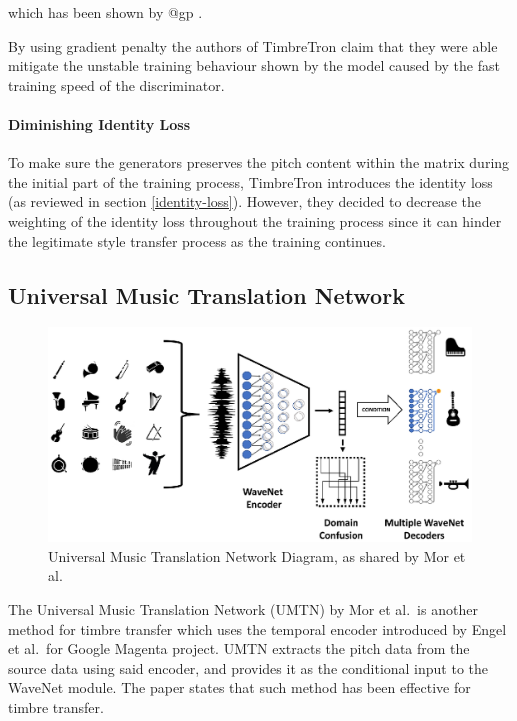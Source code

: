 \documentclass[12pt,a4paper,]{report}
\begin{document}
which has been shown by @gp .

By using gradient penalty the authors of TimbreTron claim that they were
able mitigate the unstable training behaviour shown by the model caused
by the fast training speed of the discriminator.

\paragraph{Diminishing Identity Loss}

To make sure the generators preserves the pitch content within the
matrix during the initial part of the training process, TimbreTron
introduces the identity loss (as reviewed in section
\ref{identity-loss}). However, they decided to decrease the weighting of
the identity loss throughout the training process since it can hinder
the legitimate style transfer process as the training continues.

\hypertarget{universal-music-translation-network}{%
\subsection{Universal Music Translation
Network}\label{universal-music-translation-network}}

\begin{figure}[h]
    \includegraphics[width=\textwidth]{figures/facebook_umtn.eps}
    \centering
    \caption{Universal Music Translation Network Diagram, as shared by Mor et al. \label{fig:facebook_umtn}}
\end{figure}

The Universal Music Translation Network (UMTN) by Mor et al.~is another
method for timbre transfer which uses the temporal encoder introduced by
Engel et al.~for Google Magenta project. UMTN extracts the pitch data
from the source data using said encoder, and provides it as the
conditional input to the WaveNet module. The paper states that such
method has been effective for timbre transfer.
\end{document}
